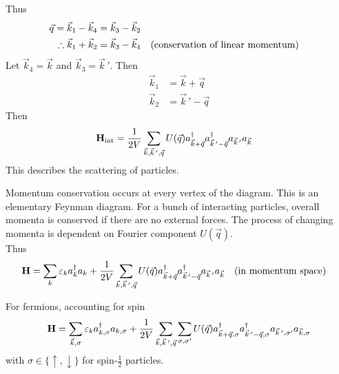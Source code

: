\documentclass[12pt,a4paper,titlepage]{article}
\newcommand{\trm}[1]{\textrm{#1}} %
\newcommand{\up}{\uparrow} %
\newcommand{\dn}{\downarrow} %
\begin{document}
Thus
\begin{equation}
\begin{aligned}
\vec{q}=\vec{k}_{1}-\vec{k}_{4}&=\vec{k}_{3}-\vec{k}_{2}\\
\therefore\vec{k}_{1}+\vec{k}_{2}&=\vec{k}_{3}-\vec{k}_{4}\qq{(conservation of linear momentum)}
\end{aligned}
\end{equation}
Let $\vec{k}_{4}=\vec{k}$ and $\vec{k}_{3}=\vec{k}\,'$. Then
\begin{equation}
\begin{aligned}
\vec{k}_{1}&=\vec{k}+\vec{q}\\
\vec{k}_{2}&=\vec{k}\,'-\vec{q}
\end{aligned}
\end{equation}
Then
\begin{equation}
\begin{aligned}
\vb{H}_{\trm{int}}&=\frac{1}{2V}\sum_{\vec{k},\vec{k}\,',\vec{q}}U(\vec{q})a_{\vec{k}+\vec{q}}^{\dagger}a_{\vec{k}\,'-\vec{q}}^{\dagger}a_{\vec{k}\,'}a_{\vec{k}}
\end{aligned}
\end{equation}
This describes the scattering of particles.
\begin{center}
\end{center}
Momentum conservation occurs at every vertex of the diagram. This is an elementary Feynman diagram. For a bunch of interacting particles, overall momenta is conserved if there are no external forces. The process of changing momenta is dependent on Fourier component $U(\vec{q})$.\\

Thus
\begin{equation}
\vb{H}=\sum_{k}\varepsilon_{k}a_{k}^{\dagger}a_{k}+\frac{1}{2V}\sum_{\vec{k},\vec{k}\,',\vec{q}}U(\vec{q})a_{\vec{k}+\vec{q}}^{\dagger}a_{\vec{k}\,'-\vec{q}}^{\dagger}a_{\vec{k}\,'}a_{\vec{k}}\qq{(in momentum space)}
\end{equation}

For fermions, accounting for spin
\begin{equation}
\vb{H}=\sum_{\vec{k},\sigma}\varepsilon_{k}a_{k,\sigma}^{\dagger}a_{k,\sigma}+\frac{1}{2V}\sum_{\vec{k},\vec{k}\,',\vec{q}}\sum_{\sigma,\sigma^{\prime}}U(\vec{q})a_{\vec{k}+\vec{q},\sigma}^{\dagger}a_{\vec{k}\,'-\vec{q},\sigma}^{\dagger}a_{\vec{k}\,',\sigma^{\prime}}a_{\vec{k},\sigma}
\end{equation}
with $\sigma\in\{\up,\dn\}$ for spin-$\frac{1}{2}$ particles.\\
\end{document}
